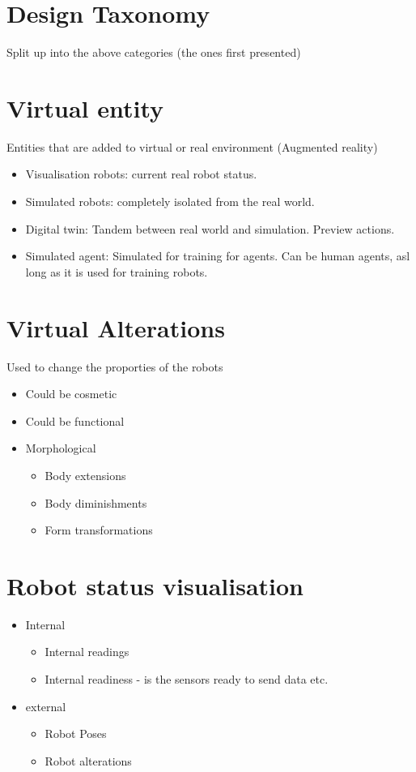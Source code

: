 \documentclass[a4paper]{article}
\begin{document}
\section{Design Taxonomy}
Split up into the above categories (the ones first presented)

\section{Virtual entity}
Entities that are added to virtual or real environment (Augmented reality)
\begin{itemize}
	\item Visualisation robots: current real robot status.
	\item Simulated robots: completely isolated from the real world. 
	\item Digital twin: Tandem between real world and simulation. Preview actions.
	\item Simulated agent: Simulated for training for agents. Can be human agents, asl long as it is used for training robots. 
\end{itemize}

\section{Virtual Alterations}
Used to change the proporties of the robots
\begin{itemize}
	\item Could be cosmetic
	\item Could be functional
	\item Morphological
		\begin{itemize}
			\item Body extensions
			\item Body diminishments
			\item Form transformations
		\end{itemize}
\end{itemize}


\section{Robot status visualisation}
\begin{itemize}
	\item Internal
		\begin{itemize}
			\item Internal readings
			\item Internal readiness - is the sensors ready to send data etc. 
		\end{itemize}
	\item external
		\begin{itemize}
			\item Robot Poses
			\item Robot alterations
		\end{itemize}
\end{itemize}
\end{document}
